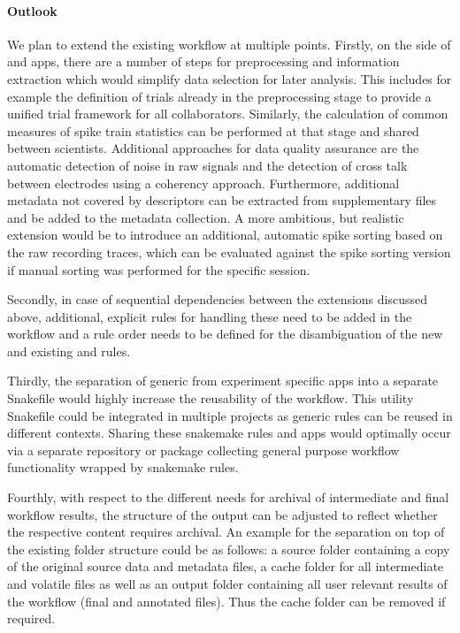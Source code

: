 \paragraph{Outlook}
We plan to extend the existing workflow at multiple points. Firstly, on the side of  and  apps, there are a number of  steps for preprocessing and information extraction which would simplify data selection for later analysis. This includes for example the definition of trials already in the preprocessing stage to provide a unified trial framework for all collaborators. Similarly, the calculation of common measures of spike train statistics can be performed at that stage and shared between scientists. Additional approaches for data quality assurance are the automatic detection of noise in raw signals and the detection of cross talk between electrodes using a coherency approach. Furthermore, additional metadata not covered by descriptors can be extracted from supplementary files and be added to the metadata collection. A more ambitious, but realistic extension would be to introduce an additional, automatic spike sorting based on the raw recording traces, which can be evaluated against the spike sorting version if manual sorting was performed for the specific session. 

Secondly, in case of sequential dependencies between the extensions discussed above, additional, explicit rules for handling these need to be added in the workflow and a rule order needs to be defined for the disambiguation of the new and existing  and  rules.

Thirdly, the separation of generic from experiment specific apps into a separate Snakefile would highly increase the reusability of the workflow. This utility Snakefile could be integrated in multiple projects as generic rules can be reused in different contexts. Sharing these snakemake rules and apps would optimally occur via a separate repository or package collecting general purpose workflow functionality wrapped by snakemake rules.

Fourthly, with respect to the different needs for archival of intermediate and final workflow results, the structure of the output can be adjusted to reflect whether the respective content requires archival. An example for the separation on top of the existing folder structure could be as follows: a source folder containing a copy of the original source data and metadata files, a cache folder for all intermediate and volatile files as well as an output folder containing all user relevant results of the workflow (final  and annotated  files). Thus the cache folder can be removed if required.

